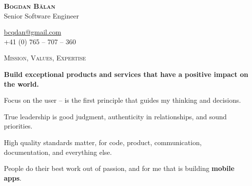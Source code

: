 \documentclass[11pt]{article}
\begin{document}
\pagestyle{empty}
\begin{multicols}{2}
  \noindent 
  \textcolor{Primary}{\textbf {\huge \textsc{Bogdan Bălan}}}\\
  Senior Software Engineer

  \columnbreak
  \raggedleft
  \href{mailto:bcqdan@gmail.com}{bcqdan@gmail.com}\\
  +41 (0) 765 -- 707 -- 360
\end{multicols}

\vspace{0.12in}
\noindent
\textcolor{Primary}{{\large \textsc{Mission, Values, Expertise}}}

\begin{list}{}{\leftmargin=0em}
  \setlength{\itemsep}{1pt}
  \setlength{\parskip}{0pt}
  \setlength{\parsep}{0pt}

\item
{\bf Build exceptional products and services that have a positive impact on the world.}
\item
Focus on the user -- is the first principle that guides my thinking and decisions.
\item
True leadership is good judgment, authenticity in relationships, and sound priorities.
\item
High quality standards matter, for code, product, communication, documentation, and everything else.
\item
People do their best work out of passion, and for me that is building \textbf{mobile apps}.

\end{list}
\end{document}
